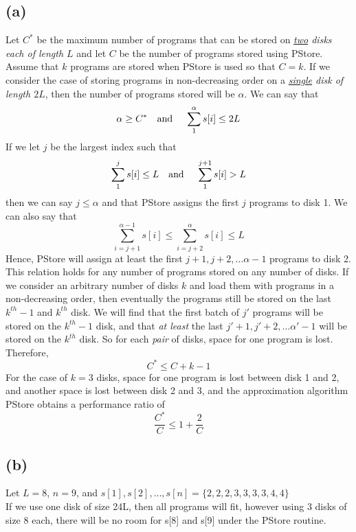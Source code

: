 	\subsection*{(a)}
		Let $C^*$ be the maximum number of programs that can be stored on \textit{\underline{two} disks each of length $L$} and let $C$ be the number of programs stored using PStore.
		Assume that $k$ programs are stored when PStore is used so that $C=k$. 
		If we consider the case of storing programs in non-decreasing order on a \textit{\underline{single} disk of length $2L$}, then the number of programs stored will be $\alpha$. 
		We can say that 
		\[\alpha \geq C^* \text{\quad and \quad} \sum_{1}^{\alpha}s[i] \leq 2L\]  
		If we let $j$ be the largest index such that
		\[\sum_{1}^{j}s[i] \leq L \text{\quad and \quad } \sum_{1}^{j+1}s[i] > L \] 
		then we can say $j\leq \alpha$ and that PStore assigns the first $j$ programs to disk 1. 
		We can also say that 
		\begin{equation*}
			\sum_{i = j+1}^{\alpha - 1}s[i] \leq \sum_{i = j+2}^{\alpha}s[i] \leq L
		\end{equation*}
		Hence, PStore will assign at least the first $j+1, j+2, \dots \alpha -1$ programs to disk 2. 
		This relation holds for any number of programs stored on any number of disks. 
		If we consider an arbitrary number of disks $k$ and load them with programs in a non-decreasing order, then eventually the programs still be stored on the last $k^{th}-1$ and $k^{th}$ disk. 
		We will find that the first batch of $j'$ programs will be stored on the $k^{th}-1$ disk, and that \textit{at least} the last $j'+1, j'+2, \dots \alpha' -1$ will be stored on the $k^{th}$ disk. 
		So for each \textit{pair} of disks, space for one program is lost. 
		Therefore, 
		\begin{equation*}
			C^* \leq C + k - 1
		\end{equation*}
		For the case of $k = 3$ disks, space for one program is lost between disk 1 and 2, and another space is lost between disk 2 and 3, and the approximation algorithm PStore obtains a performance ratio of 
		\begin{equation*}
			\frac{C^*}{C} \leq 1 + \frac{2}{C}
		\end{equation*} 
	\subsection*{(b)}
		Let $L=8$, $n=9$, and $s[1], s[2], \dots, s[n] = \{2, 2, 2, 3, 3, 3, 3, 4, 4\}$\\
		If we use one disk of size 24L, then all programs will fit, however using 3 disks of size 8 each, there will be no room for s[8] and s[9] under the PStore routine. 
		
